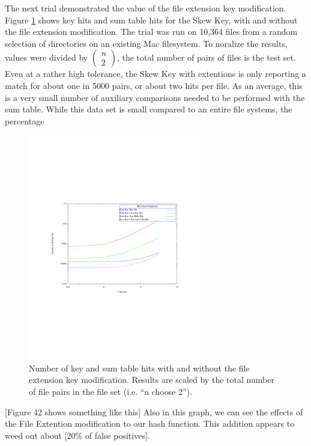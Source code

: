 \documentclass[10pt, twocolumn]{article}
\begin{document}
The next trial demonstrated the value of the file extension key modification.  Figure \ref{PairwiseSavings} shows key hits and sum table hits for the Skew Key, with and without the file extension modification.  The trial was run on 10,364 files from a random selection of directories on an existing Mac filesystem.  To noralize the results, values were divided by $\left( \begin{array}{c} n \\ 2 \end{array} \right)$, the total number of pairs of files is the test set.  Even at a rather high tolerance, the Skew Key with extentions is only reporting a match for about one in 5000 pairs, or about two hits per file.  As an average, this is a very small number of auxiliary comparisons needed to be performed with the sum table.  While this data set is small compared to an entire file systems, the percentage 

 \begin{figure}[t] 
 \centering
\includegraphics[width= 3in]{PairwiseElim.pdf}
\caption{Number of key and sum table hits with and without the file extension key modification.  Results are scaled by the total number of file pairs in the file set (i.e. ``n choose 2'').  }
\label{PairwiseSavings} 
\end{figure}



 [Figure 42 shows something like this]  Also in this graph, we can see the effects of the File Extention modification to our hash function.  This addition appears to weed out about [20\% of false positives].
\end{document}
